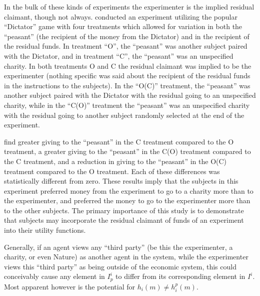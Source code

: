 \documentclass[../main.tex]{subfiles}
\begin{document}
In the bulk of these kinds of experiments the experimenter is the implied residual claimant, though not always.
\textcite{Harrison2006} conducted an experiment utilizing the popular \enquote{Dictator} game with four treatments which allowed for variation in both the \enquote{peasant} (the recipient of the money from the Dictator) and in the recipient of the residual funds.
In treatment \enquote{O}, the \enquote{peasant} was another subject paired with the Dictator, and in treatment \enquote{C}, the \enquote{peasant} was an unspecified charity.
In both treatments O and C the residual claimant was implied to be the experimenter (nothing specific was said about the recipient of the residual funds in the instructions to the subjects).
In the \enquote{O(C)} treatment, the \enquote{peasant} was another subject paired with the Dictator with the residual going to an unspecified charity, while in the \enquote{C(O)} treatment the \enquote{peasant} was an unspecified charity with the residual going to another subject randomly selected at the end of the experiment.

\textcite[196]{Harrison2006} find greater giving to the \enquote{peasant} in the C treatment compared to the O treatment, a greater giving to the \enquote{peasant} in the C(O) treatment compared to the C treatment, and a reduction in giving to the \enquote{peasant} in the O(C) treatment compared to the O treatment.
Each of these differences was statistically different from zero.
These results imply that the subjects in this experiment preferred money from the experiment to go to a charity more than to the experimenter, and preferred the money to go to the experimenter more than to the other subjects.
The primary importance of this study is to demonstrate that subjects may incorporate the residual claimant of funds of an experiment into their utility functions. 

Generally, if an agent views any \enquote{third party} (be this the experimenter, a charity, or even Nature) as another agent in the system, while the experimenter views this \enquote{third party} as being outside of the economic system, this could conceivably cause any element in $I^i_p$ to differ from its corresponding element in $I^i$.
Most apparent however is the potential for $h_i(m) \neq h_i^p(m)$.
\end{document}
